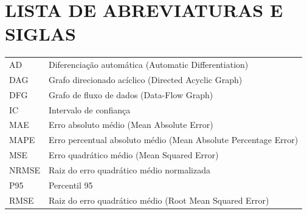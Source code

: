 \documentclass[12pt,openright,oneside,a4paper,brazil]{abntex2}
\begin{document}
\listoffigures*
\clearpage
{}
\listoftables*
\clearpage

\chapter*{LISTA DE ABREVIATURAS E SIGLAS}
\begin{tabularx}{\textwidth}{lY}
AD & Diferenciação automática (Automatic Differentiation)\\
DAG & Grafo direcionado acíclico (Directed Acyclic Graph)\\
DFG & Grafo de fluxo de dados (Data-Flow Graph)\\
IC & Intervalo de confiança\\
MAE & Erro absoluto médio (Mean Absolute Error)\\
MAPE & Erro percentual absoluto médio (Mean Absolute Percentage Error)\\
MSE & Erro quadrático médio (Mean Squared Error)\\
NRMSE & Raiz do erro quadrático médio normalizada\\
P95 & Percentil 95\\
RMSE & Raiz do erro quadrático médio (Root Mean Squared Error)
\end{tabularx}

\clearpage
\end{document}
